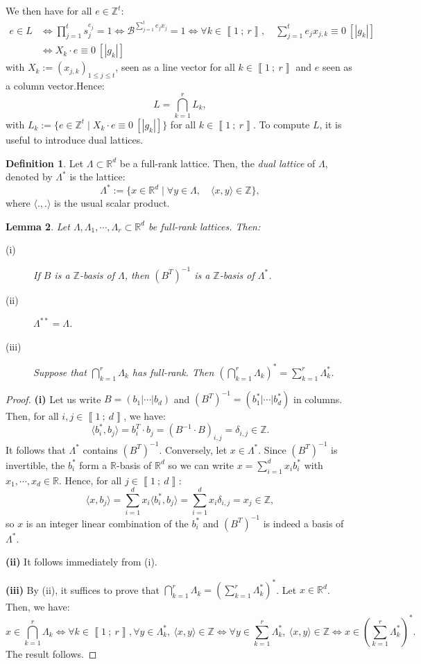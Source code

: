\documentclass[a4paper,10pt,notitlepage]{report}
\theoremstyle{definition}
\newtheorem{Definition}{Definition}[chapter]
\theoremstyle{plain}
\newtheorem{Lemma}[Definition]{Lemma}
\theoremstyle{definition}
\newcommand{\Z}{\mathbb{Z}}
\newcommand{\R}{\mathbb{R}}
\newcommand{\m}[1]{\mathcal{#1}}
\renewcommand{\i}[2]{\left\llbracket #1~;~#2\right\rrbracket}
\renewcommand{\(}{\left(}
\renewcommand{\)}{\right)}
\begin{document}
We then have for all $e\in\Z^t$:
\begin{align*} e\in L&\Longleftrightarrow \prod_{j=1}^t s_j^{e_j}=1\Longleftrightarrow \m{B}^{\sum_{j=1}^t e_jx_j}=1\Longleftrightarrow \forall k\in\i{1}{r},\quad \sum_{j=1}^t e_jx_{j,k}\equiv 0 \  [|g_k|]\\
&\Longleftrightarrow X_k\cdot e\equiv 0 \ [|g_k|]
\end{align*}
with $X_k:=(x_{j,k})_{1\leq j\leq t}$, seen as a line vector for all $k\in\i{1}{r}$ and $e$ seen as a column vector.Hence:
\[L=\bigcap_{k=1}^r L_k,\]
with $L_k:=\{e\in\Z^t\mid X_k\cdot e\equiv 0 \ [|g_k|]\}$ for all $k\in\i{1}{r}$.  To compute $L$, it is useful to introduce dual lattices. 

\begin{Definition}
Let $\Lambda\subset\R^d$ be a full-rank lattice. Then, the \emph{dual lattice} of $\Lambda$, denoted by $\Lambda^*$ is the lattice:
\[\Lambda^*:=\{x\in\R^d\mid \forall y\in\Lambda, \quad \langle x,y\rangle\in\Z\},\]
where $\langle.,.\rangle$ is the usual scalar product.
\end{Definition}

\begin{Lemma}\label{Lemma 16}
Let $\Lambda, \Lambda_1, \cdots, \Lambda_r\subset\R^d$ be full-rank lattices.  Then:

\begin{description}
\item[(i)] If $B$ is a $\Z$-basis of $\Lambda$, then $(B^T)^{-1}$ is a $\Z$-basis of $\Lambda^*$.
\item[(ii)] $\Lambda^{**}=\Lambda$.
\item[(iii)] Suppose that $\bigcap_{k=1}^r\Lambda_k$ has full-rank. Then $ \(\bigcap_{k=1}^r\Lambda_k\)^*=\sum_{k=1}^r \Lambda_k^*$.
\end{description}
\end{Lemma}

\begin{proof}
\textbf{(i)} Let us write $B=(b_1|\cdots|b_d)$ and  $(B^T)^{-1}=(b_1^*|\cdots|b_d^*)$ in columns.  Then, for all $i,j \in\i{1}{d}$, we have:
\[\langle b_i^*, b_j\rangle=b_i^T\cdot b_j=(B^{-1}\cdot B)_{i, j}=\delta_{i,j}\in\Z.\]
It follows that $\Lambda^*$ contains $(B^T)^{-1}$. Conversely, let $x\in\Lambda^*$. Since $(B^T)^{-1}$ is invertible, the $b_i^*$ form a $\R$-basis of $\R^d$ so we can write $x=\sum_{i=1}^d x_i b_i^*$ with $x_1, \cdots, x_d\in\R$. Hence, for all $j\in\i{1}{d}$:
\[\langle x, b_j\rangle=\sum_{i=1}^d x_i\langle b_i^*,b_j\rangle=\sum_{i=1}^d x_i\delta_{i, j}=x_j\in\Z,\]
so $x$ is an integer linear combination of the $b_i^*$ and $(B^T)^{-1}$ is indeed a basis of $\Lambda^*$.

\textbf{(ii)} It follows immediately from (i).

\textbf{(iii)} By (ii), it suffices to prove that $\bigcap_{k=1}^r\Lambda_k=\(\sum_{k=1}^r \Lambda_k^*\)^*$. Let $x\in\R^d$. Then, we have:
\[x\in \bigcap_{k=1}^r\Lambda_k \Longleftrightarrow \forall k\in\i{1}{r}, \forall y\in \Lambda_k^*,  \  \langle x,y\rangle\in \Z\Longleftrightarrow \forall y\in\sum_{k=1}^r\Lambda_k^*, \ \langle x, y\rangle\in\Z\Longleftrightarrow x\in \(\sum_{k=1}^r \Lambda_k^*\)^*.\]
The result follows.
\end{proof}
\end{document}
